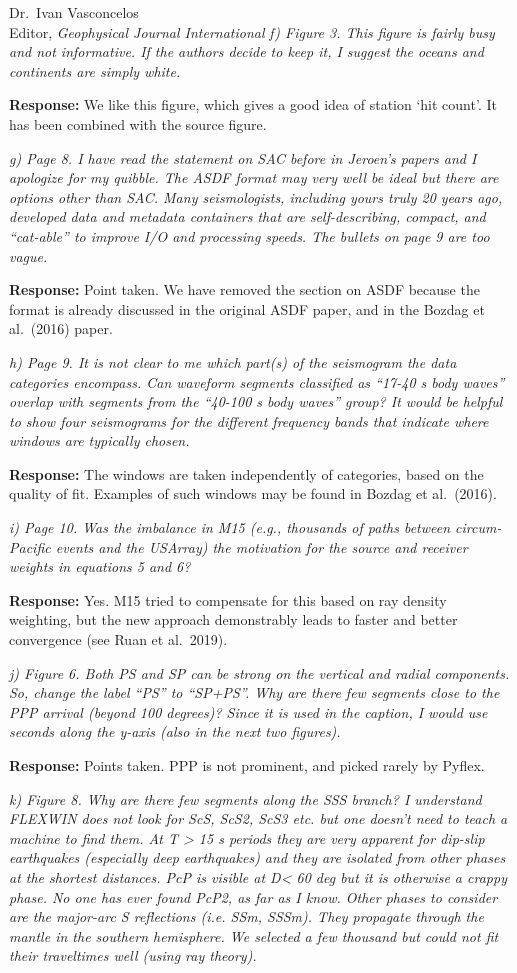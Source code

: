 \documentclass[11pt,a4paper]{letter}
\newcommand{\response}[1]{\textbf{Response:} #1}
\newcommand{\rev}[1]{{\it{#1}}}
\begin{document}
\begin{letter}{Dr.~Ivan Vasconcelos\\
Editor, \textit{Geophysical Journal International}}
\rev{f) Figure 3. This figure is fairly busy and not informative. If the authors decide to keep it, I suggest the oceans and continents are simply white.
}

\response{We like this figure, which gives a good idea of station `hit count'. It has been combined with the source figure.
}

\rev{g) Page 8. I have read the statement on SAC before in Jeroen's papers and I apologize for my quibble. The ASDF format may very well be ideal but there are options other than SAC. Many seismologists, including yours truly 20 years ago, developed data and metadata containers that are self-describing, compact, and ``cat-able'' to improve I/O and processing speeds. The bullets on page 9 are too vague.
}

\response{Point taken. We have removed the section on ASDF because the format is already discussed in the original ASDF paper, and in the Bozdag et al.~(2016) paper.}

\rev{h) Page 9. It is not clear to me which part(s) of the seismogram the data categories encompass. Can waveform segments classified as ``17-40 s body waves'' overlap with segments from the ``40-100 s body waves'' group? It would be helpful to show four seismograms for the different frequency bands that indicate where windows are typically chosen.
}

\response{The windows are taken independently of categories, based on the quality of fit. Examples of such windows may be found in Bozdag et al.~(2016).}

\rev{i) Page 10. Was the imbalance in M15 (e.g., thousands of paths between circum-Pacific events and the USArray) the motivation for the source and receiver weights in equations 5 and 6?
}

\response{Yes. M15 tried to compensate for this based on ray density weighting, but the new approach demonstrably leads to faster and better convergence (see Ruan et al.~2019).}

\rev{j) Figure 6. Both PS and SP can be strong on the vertical and radial components. So, change the label ``PS'' to ``SP+PS''. Why are there few segments close to the PPP arrival (beyond 100 degrees)? Since it is used in the caption, I would use seconds along the y-axis (also in the next two figures).
}

\response{Points taken. PPP is not prominent, and picked rarely by Pyflex.}

\rev{k) Figure 8. Why are there few segments along the SSS branch? I understand FLEXWIN does not look for ScS, ScS2, ScS3 etc. but one doesn't need to teach a machine to find them.
At T > 15 s periods they are very apparent for dip-slip earthquakes (especially deep earthquakes) and they are isolated from other phases at the shortest distances.
PcP is visible at D< 60 deg but it is otherwise a crappy phase. No one has ever found PcP2, as far as I know. Other phases to consider are the major-arc S reflections (i.e. SSm, SSSm). 
They propagate through the mantle in the southern hemisphere. We selected a few thousand but could not fit their traveltimes well (using ray theory).
}


\end{letter}
\end{document}
